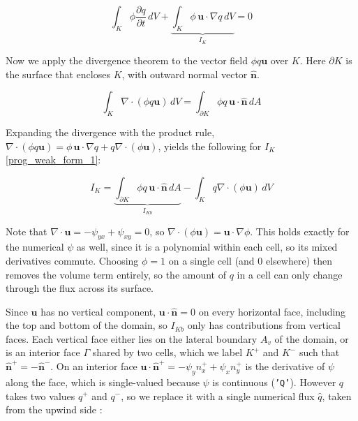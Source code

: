 \documentclass{article}
\begin{document}
\begin{equation}\label{prog_weak_form_1}
    \int_K {\phi \frac{\partial q}{\partial t} \,dV} + \underbrace{\int_K {\phi\, \bm u \cdot \nabla q \,dV}}_{I_K} = 0
\end{equation}

Now we apply the divergence theorem to the vector field $\phi q \bm u$ over $K$.
Here $\partial K$ is the surface that encloses $K$, with outward normal vector $\bm{\hat n}$.

\begin{equation}\label{divergence_theorem}
    \int_K {\nabla \cdot \left( \phi q \bm u \right) \,dV} = \int_{\partial K} {\phi q\, \bm u \cdot \bm{\hat n} \,dA}
\end{equation}

Expanding the divergence with the product rule, $\nabla \cdot \left( \phi q \bm u \right) = \phi\, \bm u \cdot \nabla q + q \nabla \cdot \left( \phi \bm u \right)$, yields the following for $I_K$ \eqref{prog_weak_form_1}:

\begin{equation}\label{i_k}
    I_K = \underbrace{\int_{\partial K} {\phi q\, \bm u \cdot \bm{\hat n} \,dA}}_{I_{Kb}} - \int_K {q \nabla \cdot \left( \phi \bm u \right) \,dV}
\end{equation}

Note that $\nabla \cdot \bm u = -\psi_{yx} + \psi_{xy} = 0$, so $\nabla \cdot (\phi \bm u) = \bm u \cdot \nabla \phi$.
This holds exactly for the numerical $\psi$ as well, since it is a polynomial within each cell, so its mixed derivatives commute.
Choosing $\phi = 1$ on a single cell (and $0$ elsewhere) then removes the volume term entirely, so the amount of $q$ in a cell can only change through the flux across its surface.

Since $\bm u$ has no vertical component, $\bm u \cdot \bm{\hat n} = 0$ on every horizontal face, including the top and bottom of the domain, so $I_{Kb}$ only has contributions from vertical faces.
Each vertical face either lies on the lateral boundary $A_v$ of the domain, or is an interior face $\Gamma$ shared by two cells, which we label $K^+$ and $K^-$ such that $\bm{\hat n}^+ = -\bm{\hat n}^-$.
On an interior face $\bm u \cdot \bm{\hat n}^+ = -\psi_y n^+_x + \psi_x n^+_y$ is the derivative of $\psi$ along the face, which is single-valued because $\psi$ is continuous (\texttt{'Q'}).
However $q$ takes two values $q^+$ and $q^-$, so we replace it with a single numerical flux $\hat q$, taken from the upwind side \cite{CockburnShu1991, FiredrakeUserManual}:
\end{document}

